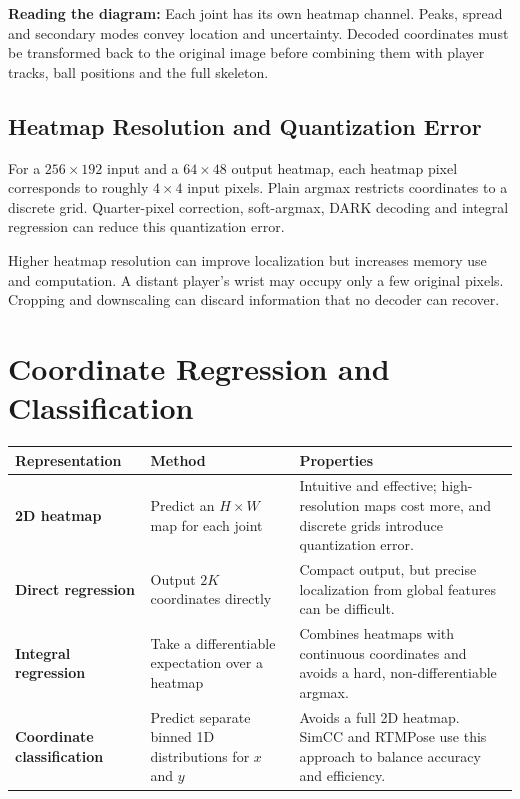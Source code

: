\documentclass[11pt,a4paper,oneside]{report}
\begin{document}
\begin{plainBox}
\textbf{Reading the diagram:}\quad
Each joint has its own heatmap channel. Peaks, spread and secondary modes convey location and uncertainty. Decoded coordinates must be transformed back to the original image before combining them with player tracks, ball positions and the full skeleton.
\end{plainBox}

\subsection{Heatmap Resolution and Quantization Error}


For a $256\times192$ input and a $64\times48$ output heatmap, each heatmap pixel corresponds to roughly $4\times4$ input pixels. Plain argmax restricts coordinates to a discrete grid. Quarter-pixel correction, soft-argmax, DARK decoding and integral regression can reduce this quantization error.

Higher heatmap resolution can improve localization but increases memory use and computation. A distant player's wrist may occupy only a few original pixels. Cropping and downscaling can discard information that no decoder can recover.

\section{Coordinate Regression and Classification}

\begin{tabularx}{\textwidth}{>{\bfseries\RaggedRight}p{3.5cm} Y Y}
\toprule
Representation & Method & Properties \\
\midrule
2D heatmap & Predict an $H\times W$ map for each joint & Intuitive and effective; high-resolution maps cost more, and discrete grids introduce quantization error.\\
Direct regression & Output $2K$ coordinates directly & Compact output, but precise localization from global features can be difficult.\\
Integral regression & Take a differentiable expectation over a heatmap & Combines heatmaps with continuous coordinates and avoids a hard, non-differentiable argmax.\\
Coordinate classification & Predict separate binned 1D distributions for $x$ and $y$ & Avoids a full 2D heatmap. SimCC and RTMPose use this approach to balance accuracy and efficiency.\\
\bottomrule
\end{tabularx}
\end{document}
